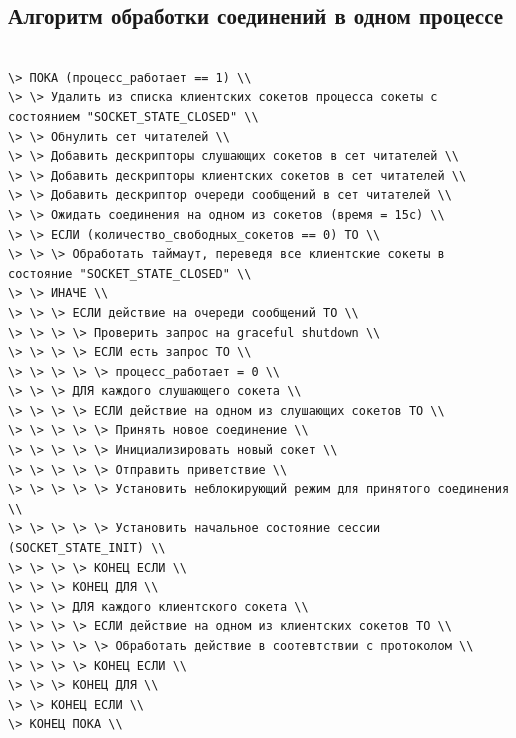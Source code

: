 \documentclass[a4paper,12pt]{report}
\begin{document}
\subsection{Алгоритм обработки соединений в одном процессе}
\begin{verbatim}

\> ПОКА (процесс_работает == 1) \\
\> \> Удалить из списка клиентских сокетов процесса сокеты с состоянием "SOCKET_STATE_CLOSED" \\
\> \> Обнулить сет читателей \\
\> \> Добавить дескрипторы слушающих сокетов в сет читателей \\
\> \> Добавить дескрипторы клиентских сокетов в сет читателей \\
\> \> Добавить дескриптор очереди сообщений в сет читателей \\ 
\> \> Ожидать соединения на одном из сокетов (время = 15с) \\
\> \> ЕСЛИ (количество_свободных_сокетов == 0) ТО \\
\> \> \> Обработать таймаут, переведя все клиентские сокеты в состояние "SOCKET_STATE_CLOSED" \\
\> \> ИНАЧЕ \\
\> \> \> ЕСЛИ действие на очереди сообщений ТО \\
\> \> \> \> Проверить запрос на graceful shutdown \\
\> \> \> \> ЕСЛИ есть запрос ТО \\
\> \> \> \> \> процесс_работает = 0 \\
\> \> \> ДЛЯ каждого слушающего сокета \\
\> \> \> \> ЕСЛИ действие на одном из слушающих сокетов ТО \\
\> \> \> \> \> Принять новое соединение \\
\> \> \> \> \> Инициализировать новый сокет \\
\> \> \> \> \> Отправить приветствие \\
\> \> \> \> \> Установить неблокирующий режим для принятого соединения \\
\> \> \> \> \> Установить начальное состояние сессии (SOCKET_STATE_INIT) \\
\> \> \> \> КОНЕЦ ЕСЛИ \\
\> \> \> КОНЕЦ ДЛЯ \\
\> \> \> ДЛЯ каждого клиентского сокета \\
\> \> \> \> ЕСЛИ действие на одном из клиентских сокетов ТО \\
\> \> \> \> \> Обработать действие в соотевтствии с протоколом \\
\> \> \> \> КОНЕЦ ЕСЛИ \\
\> \> \> КОНЕЦ ДЛЯ \\
\> \> КОНЕЦ ЕСЛИ \\
\> КОНЕЦ ПОКА \\

\end{verbatim}
\end{document}
